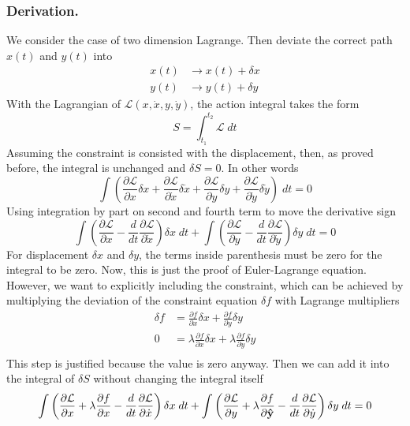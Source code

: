 \documentclass[../../../main.tex]{subfiles}
\begin{document}
\subsubsection*{Derivation.}
We consider the case of two dimension Lagrange.
Then deviate the correct path $x(t)$ and $y(t)$ into
\begin{align*}
	x(t) & \rightarrow x(t)+\delta x \\
	y(t) & \rightarrow y(t)+\delta y
\end{align*}
With the Lagrangian of $\mathcal{L}(x,\dot{x},y,\dot{y})$, the action integral takes the form
\begin{equation*}
	S=\int_{t_1}^{t_2}\mathcal{L}\;dt
\end{equation*}
Assuming the constraint is consisted with the displacement, then, as proved before, the integral is unchanged and $\delta S=0$. In other words
\begin{equation*}
	\int\left(\frac{\partial \mathcal{L}}{\partial x}\delta x+\frac{\partial\mathcal{L}}{\partial \dot{x}}\delta \dot{x}+\frac{\partial\mathcal{L}}{\partial y}\delta y+\frac{\partial\mathcal{L}}{\partial\dot{y}}\delta \dot{y}\right)\;dt=0
\end{equation*}
Using integration by part on second and fourth term to move the derivative sign
\begin{equation*}
	\int\left(\frac{\partial\mathcal{L}}{\partial x}-\frac{d}{dt}\frac{\partial\mathcal{L}}{\partial \dot{x}}\right)\delta x\;dt+\int \left(\frac{\partial\mathcal{L}}{\partial y}-\frac{d}{dt}\frac{\partial\mathcal{L}}{\partial \dot{y}}\right)\delta y\;dt=0
\end{equation*}
For displacement $\delta x$ and $\delta y$, the terms inside parenthesis must be zero for the integral to be zero.
Now, this is just the proof of Euler-Lagrange equation.
However, we want to explicitly including the constraint, which can be achieved by multiplying the deviation of the constraint equation $\delta f$ with Lagrange multipliers
\begin{align*}
	\delta f & =\frac{\partial f}{\partial x}\delta x +\frac{\partial f}{\partial y}\delta y               \\
	0        & =\lambda\frac{\partial f}{\partial x}\delta x +\lambda\frac{\partial f}{\partial y}\delta y \\
\end{align*}
This step is justified because the value is zero anyway.
Then we can add it into the integral of $\delta S$ without changing the integral itself
\begin{equation*}
	\int\left(\frac{\partial\mathcal{L}}{\partial x}+\lambda\frac{\partial f}{\partial x}-\frac{d}{dt}\frac{\partial\mathcal{L}}{\partial \dot{x}}\right)\delta x\;dt+\int \left(\frac{\partial\mathcal{L}}{\partial y}+\lambda\frac{\partial f}{\partial \mathbf{\hat{y}}}-\frac{d}{dt}\frac{\partial\mathcal{L}}{\partial \dot{y}}\right)\delta y\;dt=	0
\end{equation*}
\end{document}
